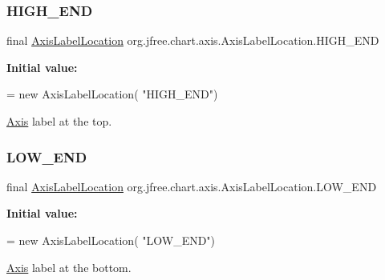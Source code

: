 \subsubsection{\texorpdfstring{H\+I\+G\+H\+\_\+\+E\+ND}{HIGH\_END}}
{\footnotesize\ttfamily final \mbox{\hyperlink{classorg_1_1jfree_1_1chart_1_1axis_1_1_axis_label_location}{Axis\+Label\+Location}} org.\+jfree.\+chart.\+axis.\+Axis\+Label\+Location.\+H\+I\+G\+H\+\_\+\+E\+ND\hspace{0.3cm}{\ttfamily [static]}}

{\bfseries Initial value\+:}
\begin{DoxyCode}
= \textcolor{keyword}{new} AxisLabelLocation(
            \textcolor{stringliteral}{"HIGH\_END"})
\end{DoxyCode}
\mbox{\hyperlink{classorg_1_1jfree_1_1chart_1_1axis_1_1_axis}{Axis}} label at the top. \mbox{\label{classorg_1_1jfree_1_1chart_1_1axis_1_1_axis_label_location_a8eb51f5bd2922af1686651df7f516885}} 
\subsubsection{\texorpdfstring{L\+O\+W\+\_\+\+E\+ND}{LOW\_END}}
{\footnotesize\ttfamily final \mbox{\hyperlink{classorg_1_1jfree_1_1chart_1_1axis_1_1_axis_label_location}{Axis\+Label\+Location}} org.\+jfree.\+chart.\+axis.\+Axis\+Label\+Location.\+L\+O\+W\+\_\+\+E\+ND\hspace{0.3cm}{\ttfamily [static]}}

{\bfseries Initial value\+:}
\begin{DoxyCode}
= \textcolor{keyword}{new} AxisLabelLocation(
            \textcolor{stringliteral}{"LOW\_END"})
\end{DoxyCode}
\mbox{\hyperlink{classorg_1_1jfree_1_1chart_1_1axis_1_1_axis}{Axis}} label at the bottom. \mbox{\label{classorg_1_1jfree_1_1chart_1_1axis_1_1_axis_label_location_aeb7faa19a7ce53da12faa53950eb8c75}} 

